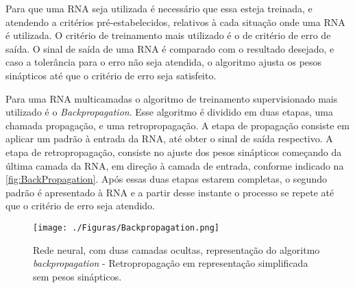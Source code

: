Para que uma RNA seja utilizada é necessário que essa esteja treinada, e atendendo a critérios pré-estabelecidos, relativos à cada situação onde uma RNA é utilizada. O critério de treinamento mais utilizado é o de critério de erro de saída. O sinal de saída de uma RNA é comparado com o resultado desejado, e caso a tolerância para o erro não seja atendida, o algoritmo ajusta os pesos sinápticos até que o critério de erro seja satisfeito. 

Para uma RNA multicamadas o algoritmo de treinamento supervisionado mais utilizado é o \textit{Backpropagation}. Esse algoritmo é dividido em duas etapas, uma chamada propagação, e uma retropropagação. A etapa de propagação consiste em aplicar um padrão à entrada da RNA, até obter o sinal de saída respectivo. A etapa de retropropagação, consiste no ajuste dos pesos sinápticos começando da última camada da RNA, em direção à camada de entrada, conforme indicado na \autoref{fig:BackPropagation}. Após essas duas etapas estarem completas, o segundo padrão é apresentado à RNA e a partir desse instante o processo se repete até que o critério de erro seja atendido.

\begin{figure}[H]
	\begin{center}   
		\caption{Rede neural, com duas camadas ocultas, representação do algoritmo \textit{backpropagation} - Retropropagação em representação simplificada sem pesos sinápticos.}
		\label{fig:BackPropagation}
		\texttt{[image: ./Figuras/Backpropagation.png]}
	\end{center}
\end{figure}


%

